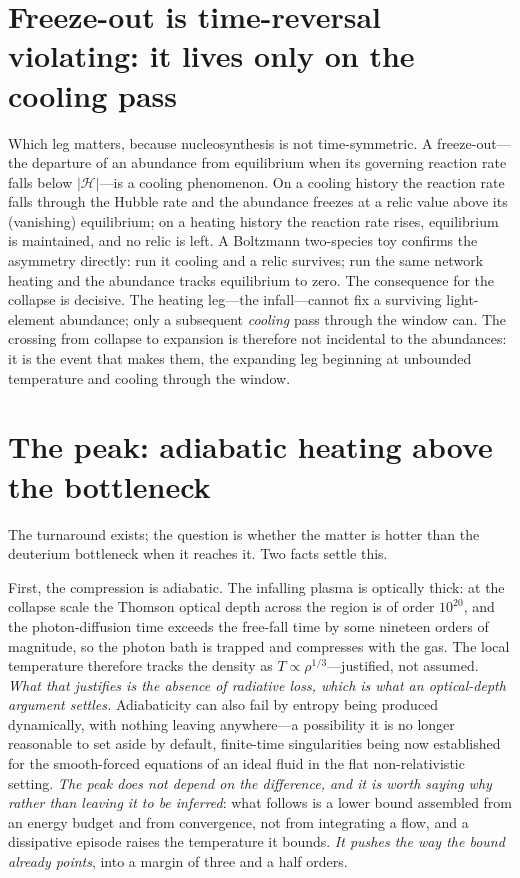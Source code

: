 \documentclass[11pt,a4paper]{article}
\theoremstyle{plain}
\theoremstyle{definition}
\theoremstyle{remark}
\begin{document}
\section{Freeze-out is time-reversal violating: it lives only on the cooling pass}\label{sec:trev}
Which leg matters, because nucleosynthesis is not time-symmetric. A freeze-out---the departure
of an abundance from equilibrium when its governing reaction rate falls below $|\mathcal
H|$---is a cooling phenomenon. On a cooling history the reaction rate falls through the Hubble
rate and the abundance freezes at a relic value above its (vanishing) equilibrium; on a heating
history the reaction rate rises, equilibrium is maintained, and no relic is left. A Boltzmann
two-species toy confirms the asymmetry directly: run it cooling and a relic survives; run the
same network heating and the abundance tracks equilibrium to zero. The consequence for the
collapse is decisive. The heating leg---the infall---cannot fix a surviving light-element
abundance; only a subsequent \emph{cooling} pass through the window can. The crossing from collapse to expansion is therefore not incidental to the abundances: it is the event that makes
them, the expanding leg beginning at unbounded temperature and cooling through the window.

\section{The peak: adiabatic heating above the bottleneck}\label{sec:peak}
The turnaround exists; the question is whether the matter is hotter than the deuterium
bottleneck when it reaches it. Two facts settle this.

First, the compression is adiabatic. The infalling plasma is optically thick: at the collapse
scale the Thomson optical depth across the region is of order $10^{20}$, and the photon-diffusion
time exceeds the free-fall time by some nineteen orders of magnitude, so the photon bath is
trapped and compresses with the gas. The local temperature therefore tracks the density as
$T\propto\rho^{1/3}$---justified, not assumed. \emph{What that justifies is the absence of radiative loss, which is what an optical-depth argument settles.} Adiabaticity can also fail by entropy being produced dynamically, with nothing leaving anywhere---a possibility it is no longer reasonable to set aside by default, finite-time singularities being now established for the smooth-forced equations of an ideal fluid in the flat non-relativistic setting. \emph{The peak does not depend on the difference, and it is worth saying why rather than leaving it to be inferred}: what follows is a lower bound assembled from an energy budget and from convergence, not from integrating a flow, and a dissipative episode raises the temperature it bounds. \emph{It pushes the way the bound already points}, into a margin of three and a half orders.
\end{document}
